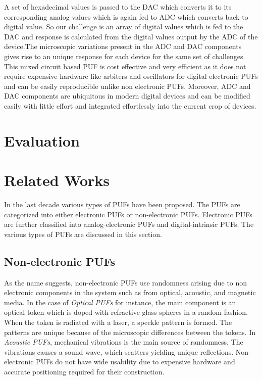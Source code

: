 A set of hexadecimal values is passed to the DAC which converts it to its corresponding analog values which is again fed to ADC which converts back to digital value. So our challenge is an array of digital values which is fed to the DAC and response is calculated from the digital values output by the ADC of the device.The microscopic variations present in the ADC and DAC components gives rise to an unique response for each device for the same set of challenges. This mixed circuit based PUF is cost effective and very efficient as it does not require expensive hardware like arbiters and oscillators for digital electronic PUFs and can be easily reproducible unlike non electronic PUFs. Moreover, ADC and DAC components are ubiquitous in modern digital devices and can be modified easily with little effort and integrated effortlessly into the current crop of devices.



\section{Evaluation}




\section{Related Works}
In the last decade various types of PUFs have been proposed. The PUFs are categorized into either
electronic PUFs or non-electronic PUFs. Electronic PUFs are further classified into analog-electronic
PUFs and digital-intrinsic PUFs. The various types of PUFs are discussed in this section.

\subsection{Non-electronic PUFs}
As the name suggests, non-electronic PUFs use randomness arising due to non electronic components in the system
such as from optical, acoustic, and magnetic media. In the case of \textit{Optical PUFs} for instance, the main 
component is an optical token which is doped with refractive glass spheres in a random fashion. When the token is 
radiated with a laser, a speckle pattern is formed. The patterns are  unique because  of the microscopic differences 
between the tokens. In \textit{Acoustic PUFs}, mechanical vibrations is the main source of
randomness. The vibrations causes a sound wave, which scatters yielding unique reflections. 
Non-electronic PUFs do not have wide usability due to expensive hardware and accurate positioning 
required for their construction.

